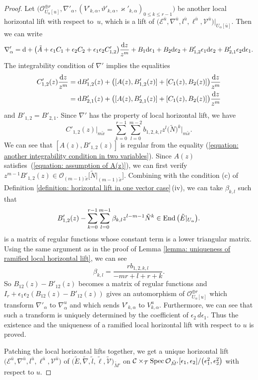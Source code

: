 \documentclass[pdftex]{sigma}
\numberwithin{equation}{section}
\newcommand\End{\mathop{\rm End}\nolimits}
\newcommand\Spec{\mathop{\rm Spec}\nolimits}
\begin{document}
\begin{proof}
Let
$\big(
{\mathcal O}_{U_{\alpha}[u]}^{\oplus r},\nabla'_{\alpha},
(V'_{k,\alpha},\vartheta'_{k,\alpha},\varkappa'_{k,\alpha})_{0\leq k\leq r-1}\big)$
be another local horizontal lift with respect to~$u$,
which is a lift of
$\big({\mathcal E}^{\bar{u}},\nabla^{\bar{u}},l^{\bar{u}},\ell^{\bar{u}},{\mathcal V}^{\bar{u}}\big)
|_{U_{\alpha}[\bar{u}]}$.
Then we can write
\[
 \nabla'_{\alpha}=
 {\rm d}+
\big( \tilde{A}+\epsilon_1C_1+\epsilon_2 C_2+\epsilon_1\epsilon_2 C'_{1,2} \big)
 \frac {{\rm d}z} {z^m}
 +B_1 {\rm d}\epsilon_1+B_2{\rm d}\epsilon_2+B'_{1,2}\epsilon_1{\rm d}\epsilon_2
 +B'_{2,1}\epsilon_2{\rm d}\epsilon_1.
\]
The integrability condition of $\nabla'$ implies the equalities
\begin{align}
 C'_{1,2}(z)\frac{{\rm d}z} {z^m}
 &=
 {\rm d}B'_{1,2}(z)+\big( [A(z), B'_{1,2}(z)]+[C_1(z),B_2(z)] \big)\frac{{\rm d}z} {z^m}
 \nonumber\\
 &={\rm d}B'_{2,1}(z)+\big( [A(z),B'_{2,1}(z)]+[C_1(z),B_2(z)] \big)\frac{{\rm d}z} {z^m}\label{equation: another integrability condition in two variables}
\end{align}
and $B'_{1,2}=B'_{2,1}$.
Since $\nabla'$ has the property of local horizontal lift,
we have
\[
 C'_{1,2}(z) \big|_{m\tilde{x}}
 =
 \sum_{k=0}^{r-1} \sum_{l=0}^{m-2}
 b_{1,2,k,l} z^l \big(\tilde{N}\big)^k\big|_{m\tilde{x}}.
\]
We can see that
$[A(z),B'_{1,2}(z)]$ is regular from the equality
(\ref{equation: another integrability condition in two variables}).
Since $A(z)$ satisfies~(\ref{equation: assumption of A(z)}),
we can first verify
$z^{m-1}B'_{1,2}(z)\in {\mathcal O}_{(m-1)\tilde{x}}\big[\tilde{N}|_{(m-1)\tilde{x}}\big]$.
Combining with the condition (c) of
Definition \ref{definition: horizontal lift in one vector case}\,(iv),
we can take $\beta_{k,l}$ such that
\[
 B'_{1,2}(z)-\sum_{k=0}^{r-1}\sum_{l=0}^{m-1}
 \beta_{k,l} z^{l-m-1}\tilde{N}^k
 \in \End\big(\tilde{E}|_{U_{\alpha}}\big).
\]
is a matrix of regular functions whose constant term
is a lower triangular matrix.
Using the same argument as in the proof of
Lemma \ref{lemma: uniqueness of ramified local horizontal lift},
we can see
\[
 \beta_{k,l}=\frac { rb_{1,2,k,l} } { -mr+l+r+k }.
\]
So
$B_{12}(z)-B'_{12}(z)$ becomes a matrix of regular functions
and
$I_r+\epsilon_1\epsilon_2(B_{12}(z)-B'_{12}(z))$
gives an automorphism of
${\mathcal O}_{U_{\alpha}[u]}^{\oplus r}$
which transform $\nabla'_{\alpha}$ to $\nabla^u_{\alpha}$
and which sends $V'_{k,\alpha}$ to $V^u_{k,\alpha}$.
Furthermore, we can see that such a transform is uniquely
determined by the coefficient of $\epsilon_2 \, d\epsilon_1$.
Thus the existence and the uniqueness of a ramified local horizontal lift
with respect to $u$ is proved.

Patching the local horizontal lifts together,
we get a unique horizontal lift
$\big({\mathcal E}^{\bar{u}},\nabla^{\bar{u}},l^{\bar{u}},\ell^{\bar{u}},{\mathcal V}^{\bar{u}}\big)$
of
$\big(\tilde{E},\tilde{\nabla},\tilde{l},\tilde{\ell},\tilde{\mathcal V}\big)_{\tilde{M}'}$
on
${\mathcal C}\times_{\mathcal T}\Spec{\mathcal O}_{\tilde{M}'}
[\epsilon_1,\epsilon_2]/\big(\epsilon_1^2,\epsilon_2^2\big)$
with respect to $u$.
\end{proof}
\end{document}
